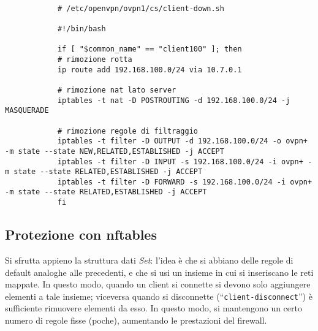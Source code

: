 		\begin{verbatim}
			
			# /etc/openvpn/ovpn1/cs/client-down.sh
			        
			#!/bin/bash
			             
			if [ "$common_name" == "client100" ]; then
			# rimozione rotta
			ip route add 192.168.100.0/24 via 10.7.0.1
			
			# rimozione nat lato server
			iptables -t nat -D POSTROUTING -d 192.168.100.0/24 -j MASQUERADE
			        
			# rimozione regole di filtraggio
			iptables -t filter -D OUTPUT -d 192.168.100.0/24 -o ovpn+ -m state --state NEW,RELATED,ESTABLISHED -j ACCEPT
			iptables -t filter -D INPUT -s 192.168.100.0/24 -i ovpn+ -m state --state RELATED,ESTABLISHED -j ACCEPT
			iptables -t filter -D FORWARD -s 192.168.100.0/24 -i ovpn+ -m state --state RELATED,ESTABLISHED -j ACCEPT
			fi
		\end{verbatim}
		
		\subsection{Protezione con nftables}
		Si sfrutta appieno la struttura dati \textit{Set}: l'idea è che si abbiano
		delle regole di default analoghe alle precedenti, e che si usi un insieme
		in cui si inseriscano le reti mappate. In questo modo, quando un client si
		connette si devono solo aggiungere elementi a tale insieme; viceversa quando
		si disconnette (``\texttt{client-disconnect}'') è sufficiente rimuovere
		elementi da esso.
		In questo modo, si mantengono un certo numero di regole fisse (poche),
		aumentando le prestazioni del firewall.
		
